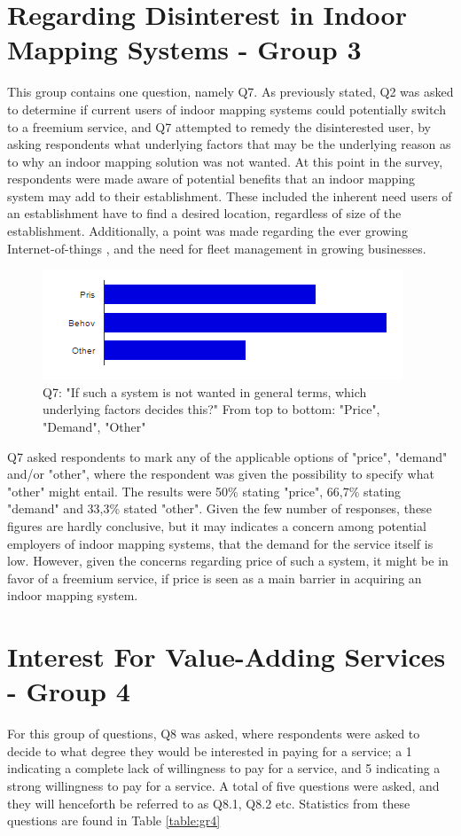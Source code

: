 \section{Regarding Disinterest in Indoor Mapping Systems - Group 3}
This group contains one question, namely Q7. As previously stated, Q2 was asked to determine if current users of indoor mapping systems could potentially switch to a freemium service, and Q7 attempted to remedy the disinterested user, by asking respondents what underlying factors that may be the underlying reason as to why an indoor mapping solution was not wanted. At this point in the survey, respondents were made aware of potential benefits that an indoor mapping system may add to their establishment. These included the inherent need users of an establishment have to find a desired location, regardless of size of the establishment. Additionally, a point was made regarding the ever growing Internet-of-things \cite{gilpress2014}, and the need for fleet management \cite{gregsterling2012} in growing businesses. 
\begin{figure}
\centering
\includegraphics{figs/q7.PNG}
\caption{Q7: "If such a system is not wanted in general terms, which underlying factors decides this?" From top to bottom: "Price", "Demand", "Other"}
\label{fig:my_label}
\end{figure}
Q7 asked respondents to mark any of the applicable options of "price", "demand" and/or "other", where the respondent was given the possibility to specify what "other" might entail. The results were 50\% stating "price", 66,7\% stating "demand" and 33,3\% stated "other". Given the few number of responses, these figures are hardly conclusive, but it may indicates a concern among potential employers of indoor mapping systems, that the demand for the service itself is low. However, given the concerns regarding price of such a system, it might be in favor of a freemium service, if price is seen as a main barrier in acquiring an indoor mapping system. 

\section{Interest For Value-Adding Services - Group 4}
For this group of questions, Q8 was asked, where respondents were asked to decide to what degree they would be interested in paying for a service; a 1 indicating a complete lack of willingness to pay for a service, and 5 indicating a strong willingness to pay for a service. A total of five questions were asked, and they will henceforth be referred to as Q8.1, Q8.2 etc. Statistics from these questions are found in Table \ref{table:gr4}

